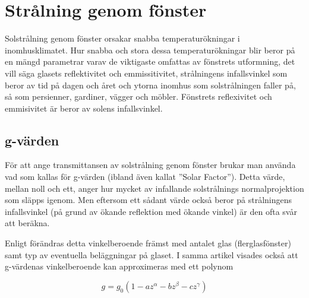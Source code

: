 \section{Strålning genom fönster}
\label{sec:sunthroughwindows}
Solstrålning genom fönster orsakar snabba temperaturökningar i inomhusklimatet. Hur snabba och stora dessa temperaturökningar blir beror på en mängd parametrar varav de viktigaste omfattas av fönstrets utformning, det vill säga glasets reflektivitet och emmissitivitet, strålningens infallsvinkel som beror av tid på dagen och året och ytorna inomhus som solstrålningen faller på, så som persienner, gardiner, vägger och möbler. Fönstrets reflexivitet och emmisivitet är beror av solens infallsvinkel.


\subsection{g-värden}\label{gvalue}

För att ange transmittansen av solstrålning genom fönster brukar man använda vad som kallas för g-värden (ibland även kallat ''Solar Factor''). Detta värde, mellan noll och ett, anger hur mycket av infallande solstrålnings normalprojektion som släpps igenom. Men eftersom ett sådant värde också beror på strålningens infallsvinkel (på grund av ökande reflektion med ökande vinkel) är den ofta svår att beräkna.

Enligt \cite{karlssonroos99} förändras detta vinkelberoende främst med antalet glas (flerglasfönster) samt typ av eventuella beläggningar på glaset. I samma artikel visades också att g-värdenas vinkelberoende kan approximeras med ett polynom

\begin{equation}\label{eq:radiationwindowstheory:gvalue}
g = g_0 \left( 1 - az^{\alpha} - bz^{\beta} - cz^{\gamma} \right)
\end{equation}

